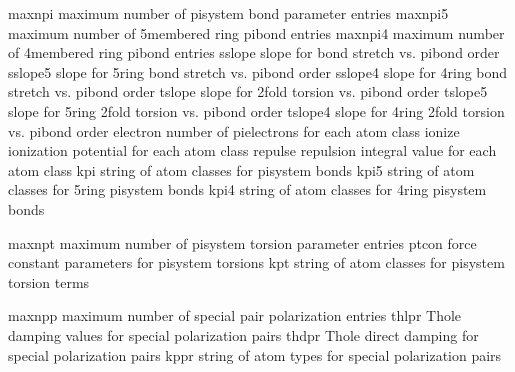 \documentclass[letterpaper,11pt,english]{sphinxmanual}
\begin{document}
\sphinxAtStartPar
{}

\begin{sphinxVerbatim}[commandchars=\\\{\}]
maxnpi          maximum number of pisystem bond parameter entries
maxnpi5         maximum number of 5\PYGZhy{}membered ring pibond entries
maxnpi4         maximum number of 4\PYGZhy{}membered ring pibond entries
sslope          slope for bond stretch vs. pi\PYGZhy{}bond order
sslope5         slope for 5\PYGZhy{}ring bond stretch vs. pi\PYGZhy{}bond order
sslope4         slope for 4\PYGZhy{}ring bond stretch vs. pi\PYGZhy{}bond order
tslope          slope for 2\PYGZhy{}fold torsion vs. pi\PYGZhy{}bond order
tslope5         slope for 5\PYGZhy{}ring 2\PYGZhy{}fold torsion vs. pi\PYGZhy{}bond order
tslope4         slope for 4\PYGZhy{}ring 2\PYGZhy{}fold torsion vs. pi\PYGZhy{}bond order
electron        number of pi\PYGZhy{}electrons for each atom class
ionize          ionization potential for each atom class
repulse         repulsion integral value for each atom class
kpi             string of atom classes for pisystem bonds
kpi5            string of atom classes for 5\PYGZhy{}ring pisystem bonds
kpi4            string of atom classes for 4\PYGZhy{}ring pisystem bonds
\end{sphinxVerbatim}

\sphinxAtStartPar
{}

\begin{sphinxVerbatim}[commandchars=\\\{\}]
maxnpt          maximum number of pi\PYGZhy{}system torsion parameter entries
ptcon           force constant parameters for pi\PYGZhy{}system torsions
kpt             string of atom classes for pi\PYGZhy{}system torsion terms
\end{sphinxVerbatim}

\sphinxAtStartPar
{}

\begin{sphinxVerbatim}[commandchars=\\\{\}]
maxnpp          maximum number of special pair polarization entries
thlpr           Thole damping values for special polarization pairs
thdpr           Thole direct damping for special polarization pairs
kppr            string of atom types for special polarization pairs
\end{sphinxVerbatim}
\end{document}
